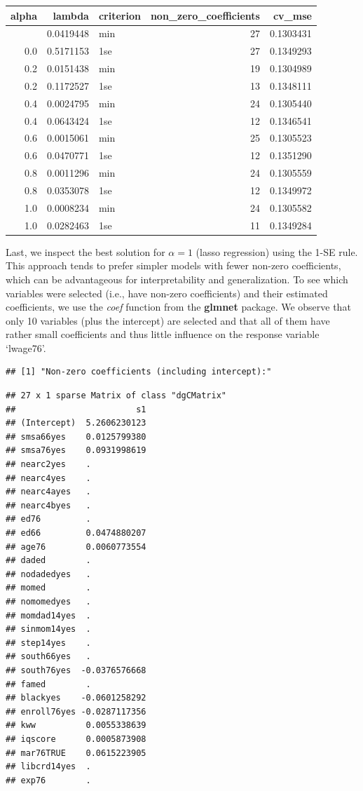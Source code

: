 \documentclass[
]{article}
\begin{document}
\begin{longtable}[]{@{}rrlrr@{}}
\toprule\noalign{}
alpha & lambda & criterion & non\_zero\_coefficients & cv\_mse \\
\midrule\noalign{}
\endhead
\bottomrule\noalign{}
\endlastfoot
0.0 & 0.0419448 & min & 27 & 0.1303431 \\
0.0 & 0.5171153 & 1se & 27 & 0.1349293 \\
0.2 & 0.0151438 & min & 19 & 0.1304989 \\
0.2 & 0.1172527 & 1se & 13 & 0.1348111 \\
0.4 & 0.0024795 & min & 24 & 0.1305440 \\
0.4 & 0.0643424 & 1se & 12 & 0.1346541 \\
0.6 & 0.0015061 & min & 25 & 0.1305523 \\
0.6 & 0.0470771 & 1se & 12 & 0.1351290 \\
0.8 & 0.0011296 & min & 24 & 0.1305559 \\
0.8 & 0.0353078 & 1se & 12 & 0.1349972 \\
1.0 & 0.0008234 & min & 24 & 0.1305582 \\
1.0 & 0.0282463 & 1se & 11 & 0.1349284 \\
\end{longtable}

Last, we inspect the best solution for \(\alpha = 1\) (lasso regression)
using the 1-SE rule. This approach tends to prefer simpler models with
fewer non-zero coefficients, which can be advantageous for
interpretability and generalization. To see which variables were
selected (i.e., have non-zero coefficients) and their estimated
coefficients, we use the \textit{coef} function from the \textbf{glmnet}
package. We observe that only 10 variables (plus the intercept) are
selected and that all of them have rather small coefficients and thus
little influence on the response variable `lwage76'.

\begin{verbatim}
## [1] "Non-zero coefficients (including intercept):"
\end{verbatim}

\begin{verbatim}
## 27 x 1 sparse Matrix of class "dgCMatrix"
##                        s1
## (Intercept)  5.2606230123
## smsa66yes    0.0125799380
## smsa76yes    0.0931998619
## nearc2yes    .           
## nearc4yes    .           
## nearc4ayes   .           
## nearc4byes   .           
## ed76         .           
## ed66         0.0474880207
## age76        0.0060773554
## daded        .           
## nodadedyes   .           
## momed        .           
## nomomedyes   .           
## momdad14yes  .           
## sinmom14yes  .           
## step14yes    .           
## south66yes   .           
## south76yes  -0.0376576668
## famed        .           
## blackyes    -0.0601258292
## enroll76yes -0.0287117356
## kww          0.0055338639
## iqscore      0.0005873908
## mar76TRUE    0.0615223905
## libcrd14yes  .           
## exp76        .
\end{verbatim}
\end{document}
